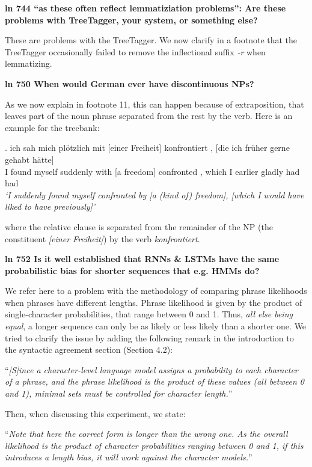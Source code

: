 \documentclass{article}
\begin{document}
\textbf{ln 744 ``as these often reflect lemmatiziation problems'': Are these problems with TreeTagger, your system, or something else?}

These are problems with the TreeTagger. We now clarify in a footnote that the TreeTagger occasionally failed to remove the inflectional suffix \textit{-r} when lemmatizing.
\newline

\textbf{ln 750 When would German ever have discontinuous NPs?}

As we now explain in footnote 11, this can happen because of extraposition, that leaves part of the noun phrase separated from the rest by the verb. Here is an example for the treebank:

\exg. ich sah   mich   plötzlich mit  [einer Freiheit] konfrontiert , [die   ich früher  gerne  gehabt hätte] \\
I   found myself suddenly  with [a     freedom]  confronted   ,  which I   earlier gladly had    had \\
\textit{`I suddenly found myself confronted by [a (kind of) freedom], [which I would have liked to have previously]'}

where the relative clause is separated from the remainder of the NP (the constituent \textit{[einer Freiheit]}) by the verb \textit{konfrontiert}.
\newline

\textbf{ln 752 Is it well established that RNNs \& LSTMs have the same probabilistic bias for shorter sequences that e.g. HMMs do?}

We refer here to a problem with the methodology of comparing phrase likelihoods when phrases have different lengths. Phrase likelihood is given by the product of single-character probabilities, that range between 0 and 1. Thus, \emph{all else being equal}, a longer sequence can only be as likely or less likely than a shorter one. We tried to clarify the issue by adding the following remark in the introduction to the syntactic agreement section (Section 4.2):

``\textit{[S]ince a character-level language model assigns a probability to each character of a phrase, and the phrase likelihood is the product of these values (all between 0 and 1), minimal sets must be controlled for character length.}''

Then, when discussing this experiment, we state:

``\textit{Note that here the correct form is longer than the wrong one. As the overall likelihood is the product of character probabilities ranging between 0 and 1, if this introduces a length bias, it will work against the character models.}''
\newline
\end{document}
